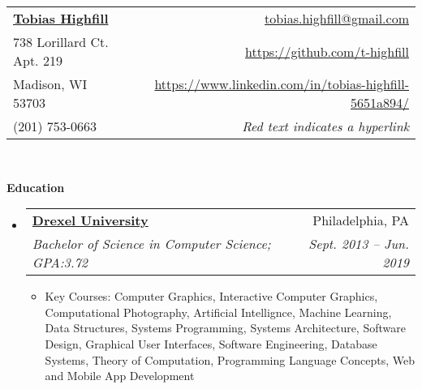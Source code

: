 \documentclass[letterpaper,11pt]{article}
\makeatletter
\newcommand{\resitem}[1]{\item #1 \vspace{-2pt}}
\newcommand{\resheading}[1]{{\large \colorbox{mygrey}{\begin{minipage}{\textwidth}{\textbf{#1 \vphantom{p\^{E}}}}\end{minipage}}}}
\newcommand{\ressubheading}[4]{
\begin{tabular*}{6.5in}{l@{\extracolsep{\fill}}r}
		\textbf{#1} & #2 \\
		\textit{#3} & \textit{#4} \\
\end{tabular*}\vspace{-6pt}}
\newcommand{\myemail}{tobias.highfill@gmail.com}
\newcommand{\mywebsite}{https://github.com/t-highfill}
\newcommand{\linkedin}{https://www.linkedin.com/in/tobias-highfill-5651a894/}
\newcommand{\smallsect}[1]{{\footnotesize #1}}
\makeatother
\begin{document}
\newcommand{\myheader}{
\begin{tabular*}{7in}{l@{\extracolsep{\fill}}r}
	\textbf{\href{\mywebsite}{\LARGE Tobias Highfill}} & \href{mailto:\myemail}{\myemail}\\
	738 Lorillard Ct. Apt. 219 & \href{\mywebsite}{\mywebsite} \\
	Madison, WI 53703 & \href{\linkedin}{\linkedin} \\
	(201) 753-0663 & \smallsect{\textit{Red text indicates a hyperlink}} \\
	\end{tabular*}
\\
\vspace{0.1in}}

\myheader

\resheading{Education}
\begin{itemize}
	\item \ressubheading{\href{https://drexel.edu/}{Drexel University}}{Philadelphia, PA}{Bachelor of Science in Computer Science; GPA:3.72}{Sept. 2013 -- Jun. 2019}
		\smallsect{
		\begin{itemize}
			\resitem{Key Courses: Computer Graphics, Interactive Computer Graphics, Computational Photography, Artificial Intellignce, Machine Learning, Data Structures, Systems Programming, Systems Architecture, Software Design, Graphical User Interfaces, Software Engineering, Database Systems, Theory of Computation, Programming Language Concepts, Web and Mobile App Development}
		\end{itemize}
		}
\end{itemize}
\end{document}
